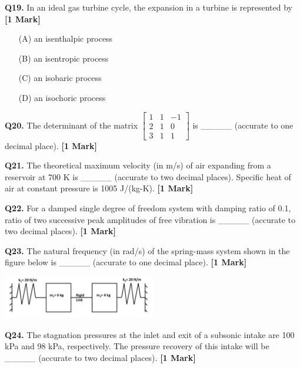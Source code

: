 \documentclass[11pt]{article}
\newcommand{\questiona}[2]{
    \noindent\textbf{Q#2.} #1 \hfill \textbf{[1 Mark]}
}
\begin{document}
\vspace{0.5cm}

\questiona{In an ideal gas turbine cycle, the expansion in a turbine is represented by}{19}
\begin{enumerate}
    \item[(A)] an isenthalpic process  
    \item[(B)] an isentropic process  
    \item[(C)] an isobaric process  
    \item[(D)] an isochoric process  
\end{enumerate}

\vspace{0.5cm}

\questiona{The determinant of the matrix $\begin{bmatrix} 1 & 1 & -1 \\ 2 & 1 & 0 \\ 3 & 1 & 1 \end{bmatrix}$ is \_\_\_\_\_ (accurate to one decimal place).}{20}

\vspace{0.5cm}

\questiona{The theoretical maximum velocity (in m/s) of air expanding from a reservoir at 700 K is \_\_\_\_\_ (accurate to two decimal places). Specific heat of air at constant pressure is 1005 J/(kg-K).}{21}

\vspace{0.5cm}

\questiona{For a damped single degree of freedom system with damping ratio of 0.1, ratio of two successive peak amplitudes of free vibration is \_\_\_\_\_ (accurate to two decimal places).}{22}

\vspace{0.5cm}

\questiona{The natural frequency (in rad/s) of the spring-mass system shown in the figure below is \_\_\_\_\_ (accurate to one decimal place).}{23}
\begin{center}
\includegraphics[width=0.5\textwidth]{figures/23.png}
\end{center}

\vspace{0.5cm}

\questiona{The stagnation pressures at the inlet and exit of a subsonic intake are 100 kPa and 98 kPa, respectively. The pressure recovery of this intake will be \_\_\_\_\_ (accurate to two decimal places).}{24}
\end{document}
